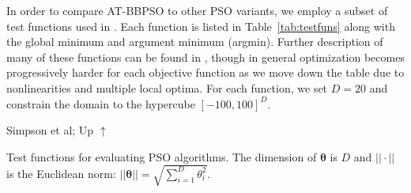 \documentclass[cmbright]{staauth}
\begin{document}
In order to compare AT-BBPSO to other PSO variants, we employ a subset of test functions used in \cite{hsieh2010modified}. Each function is listed in Table~\ref{tab:testfuns} along with the global minimum and argument minimum (argmin). Further description of many of these functions can be found in \cite{clerc2010particle}, though in general optimization becomes progressively harder for each objective function as we move down the table due to nonlinearities and multiple local optima. For each function, we set $D=20$ and constrain the domain to the hypercube $[-100, 100]^D$.

\begin{table}[p]
\begin{preview}
\centering

\ifPreview
\caption{Simpson et al; Up $\uparrow$}
\else
\caption{Test functions for evaluating PSO algorithms. The dimension of $\bm{\theta}$ is $D$ and $||\cdot||$ is the Euclidean norm: $||\bm{\theta}|| = \sqrt{\sum_{i=1}^D\theta_i^2}$.}
\label{tab:testfuns}
\fi
\end{preview}
\end{table}
\end{document}
